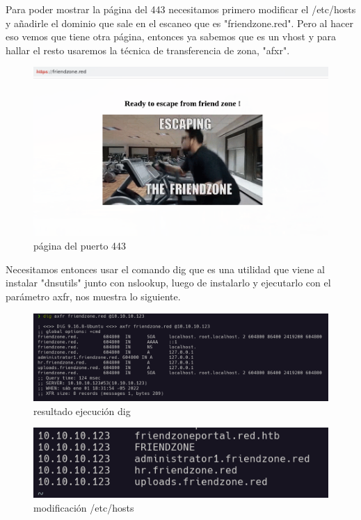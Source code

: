 \documentclass{article}
\begin{document}
Para poder mostrar la página del 443 necesitamos primero modificar el /etc/hosts y añadirle el dominio que sale en el escaneo que es "friendzone.red".
Pero al hacer eso vemos que tiene otra página, entonces ya sabemos que es un vhost y para hallar el resto usaremos la técnica de transferencia de zona, "afxr".

\begin{figure}[H]
	\center
	\includegraphics[width=\textwidth]{images/friendzone/puerto443.png}
	\caption{página del puerto 443}
\end{figure}

Necesitamos entonces usar el comando dig que es una utilidad que viene al instalar "dnsutils" junto con nslookup, luego de instalarlo y ejecutarlo con el parámetro axfr, nos muestra lo siguiente.

\begin{figure}[H]
	\center
	\includegraphics[width=\textwidth]{images/friendzone/dig-information.png}
	\caption{resultado ejecución dig}
\end{figure}



\begin{figure}[H]
	\center
	\includegraphics[width=\textwidth]{images/friendzone/modificacion-hosts.png}
	\caption{modificación /etc/hosts}
\end{figure}
\end{document}

